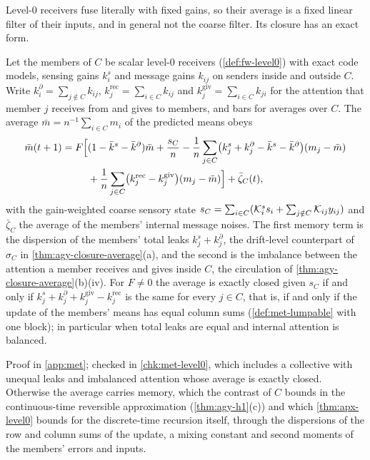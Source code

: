 Level-0 receivers fuse literally with fixed gains, so their average is a fixed linear filter of their inputs, and in general not the coarse filter. Its closure has an exact form.

\begin{proposition}\label{prop:met-level0}
Let the members of $C$ be scalar level-0 receivers (\cref{def:fw-level0}) with exact code models, sensing gains $k^s_i$ and message gains $k_{ij}$ on senders inside and outside $C$. Write $k^\partial_i=\sum_{j\notin C}k_{ij}$, $k^{\mathrm{rec}}_j=\sum_{i\in C}k_{ij}$ and $k^{\mathrm{giv}}_j=\sum_{i\in C}k_{ji}$ for the attention that member $j$ receives from and gives to members, and bars for averages over $C$. The average $\bar m=n^{-1}\sum_{i\in C}m_i$ of the predicted means obeys
\begin{equation}\label{eq:met-level0}
\begin{aligned}
\bar m(t+1)=F\Bigl[&(1-\bar k^s-\bar k^\partial)\bar m+\frac{s_C}n-\frac1n\sum_{j\in C}\bigl(k^s_j+k^\partial_j-\bar k^s-\bar k^\partial\bigr)(m_j-\bar m)\\
&+\frac1n\sum_{j\in C}\bigl(k^{\mathrm{rec}}_j-k^{\mathrm{giv}}_j\bigr)(m_j-\bar m)\Bigr]+\bar\zeta_C(t),
\end{aligned}
\end{equation}
with the gain-weighted coarse sensory state $s_C=\sum_{i\in C}(\mathcal{K}^s_is_i+\sum_{j\notin C}\mathcal{K}_{ij}y_{ij})$ and $\bar\zeta_C$ the average of the members' internal message noises. The first memory term is the dispersion of the members' total leaks $k^s_j+k^\partial_j$, the drift-level counterpart of $\sigma_C$ in \cref{thm:agy-closure-average}(a), and the second is the imbalance between the attention a member receives and gives inside $C$, the circulation of \cref{thm:agy-closure-average}(b)(iv). For $F\neq0$ the average is exactly closed given $s_C$ if and only if $k^s_j+k^\partial_j+k^{\mathrm{giv}}_j-k^{\mathrm{rec}}_j$ is the same for every $j\in C$, that is, if and only if the update of the members' means has equal column sums (\cref{def:met-lumpable} with one block); in particular when total leaks are equal and internal attention is balanced.
\end{proposition}
Proof in \cref{app:met}; checked in \cref{chk:met-level0}, which includes a collective with unequal leaks and imbalanced attention whose average is exactly closed. Otherwise the average carries memory, which the contrast of $C$ bounds in the continuous-time reversible approximation (\cref{thm:agy-h1}(c)) and which \cref{thm:apx-level0} bounds for the discrete-time recursion itself, through the dispersions of the row and column sums of the update, a mixing constant and second moments of the members' errors and inputs.

